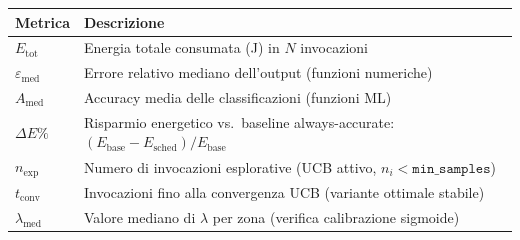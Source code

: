 \documentclass[a4paper,11pt]{article}
\begin{document}
\begin{table}[h!]
\centering
\small
\begin{tabular}{lp{10cm}}
\toprule
\textbf{Metrica} & \textbf{Descrizione} \\
\midrule
$E_{\text{tot}}$          & Energia totale consumata (J) in $N$ invocazioni \\
$\varepsilon_{\text{med}}$ & Errore relativo mediano dell'output (funzioni numeriche) \\
$A_{\text{med}}$           & Accuracy media delle classificazioni (funzioni ML) \\
$\Delta E\%$               & Risparmio energetico vs.\ baseline always-accurate:
                             $(E_\text{base} - E_\text{sched})/E_\text{base}$ \\
$n_{\text{exp}}$           & Numero di invocazioni esplorative
                             (UCB attivo, $n_i < \texttt{min\_samples}$) \\
$t_{\text{conv}}$          & Invocazioni fino alla convergenza UCB
                             (variante ottimale stabile) \\
$\lambda_{\text{med}}$     & Valore mediano di $\lambda$ per zona
                             (verifica calibrazione sigmoide) \\
\bottomrule
\end{tabular}
\end{table}
\end{document}
